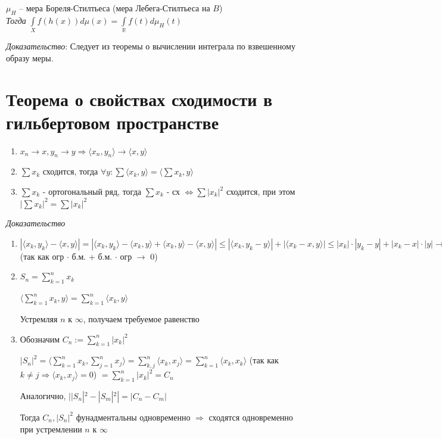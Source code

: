 \documentclass[paper=a4, fontsize=17pt]{article}
\begin{document}
$\mu_H$ -- мера Бореля-Стилтьеса (мера Лебега-Стилтьеса на $B$)\\


\emph{Тогда} $\int\limits_X f(h(x))d\mu(x) = \int\limits_{\mathbb{R}}f(t)d\mu_{H}(t)$

\emph{Доказательство}:
Следует из теоремы о вычислении интеграла по взвешенному образу меры.

\section{Теорема о свойствах сходимости в гильбертовом пространстве}
\begin{enumerate}
	\item $x_n \rightarrow x, y_n \rightarrow y \Rightarrow \langle x_n, y_n \rangle \rightarrow \langle x, y \rangle$

	\item $\sum x_k$ сходится, тогда $\forall y: \sum \langle x_k, y \rangle = \langle \sum x_k, y \rangle$

	\item $\sum x_k$ - ортогональный ряд, тогда $\sum x_k$ - сх $\Leftrightarrow \sum |x_k|^2$ сходится, при этом $|\sum x_k|^2 = \sum |x_k|^2$

\end{enumerate}

\emph{Доказательство}

\begin{enumerate}
	\item $|\langle x_k, y_k \rangle - \langle x, y \rangle| = |\langle x_k, y_k \rangle - \langle x_k, y\rangle  + \langle x_k, y\rangle  - \langle x, y\rangle | \leqslant |\langle x_k, y_k - y\rangle | + |\langle x_k - x, y\rangle | \leqslant |x_k| \cdot |y_k - y| + |x_k - x| \cdot |y| \rightarrow 0$ (так как огр $\cdot$ б.м. +  б.м. $\cdot$ огр $\rightarrow$ 0)

	\item $S_n = \sum\limits_{k = 1}^{n} x_k$

	$\langle \sum\limits_{k = 1}^n x_k, y\rangle  = \sum\limits_{k = 1}^n \langle x_k, y\rangle $

	Устремляя $n$ к $\infty$, получаем требуемое равенство

	\item Обозначим $C_n := \sum\limits_{k = 1}^n |x_k|^2$

	 $|S_n|^2 = \langle \sum\limits_{k = 1}^n x_k, \sum\limits_{j = 1}^n x_j\rangle  = \sum\limits_{k, j}^n \langle x_k, x_j\rangle  = \sum\limits_{k = 1}^n \langle x_k, x_k\rangle $ (так как $k \neq j \Rightarrow \langle x_k, x_j\rangle  = 0$) $= \sum\limits_{k = 1}^n |x_k|^2 = C_n$

	 Аналогично, $||S_n|^2 - |S_m|^2| = |C_n - C_m|$

	 Тогда $C_n, |S_n|^2$ фунадментальны одновременно $\Rightarrow$ сходятся одновременно при устремлении $n$ к $\infty$
\end{enumerate}
\end{document}
